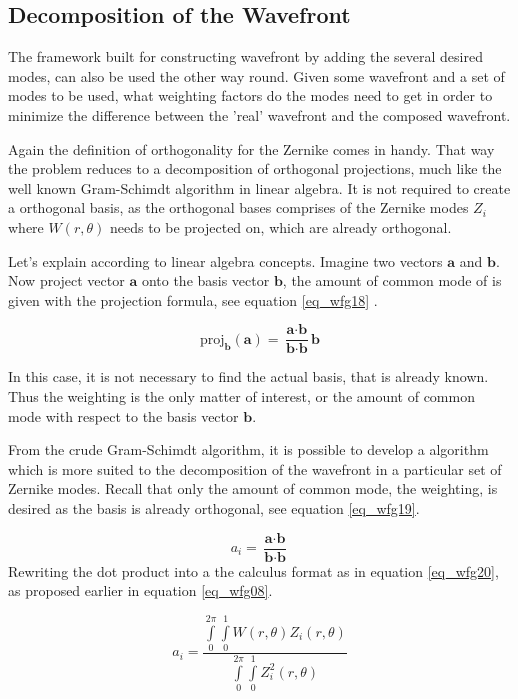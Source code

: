 \documentclass{article}
\begin{document}
\newpage
\subsection{Decomposition of the Wavefront}
The framework built for constructing wavefront by adding the several desired modes, can also be used the other way round. Given some wavefront and a set of modes to be used, what weighting factors do the modes need to get in order to minimize the difference between the 'real' wavefront and the composed wavefront.

Again the definition of orthogonality for the Zernike comes in handy. That way the problem reduces to a decomposition of orthogonal projections, much like the well known Gram-Schimdt algorithm in linear algebra. It is not required to create a orthogonal basis, as the orthogonal bases comprises of the Zernike modes $Z_i$ where $W(r,\theta)$ needs to be projected on, which are already orthogonal.

Let's explain according to linear algebra concepts. Imagine two vectors $\textbf{a}$ and $\textbf{b}$. Now project vector $\textbf{a}$ onto the basis vector $\textbf{b}$, the amount of common mode of is given with the projection formula, see equation \ref{eq_wfg18} \cite{lay}.

\begin{equation}
\text{proj}_{\textbf{b}}(\textbf{a}) = \frac{\textbf{a} \cdot \textbf{b}}{\textbf{b} \cdot \textbf{b}} \textbf{b}
\label{eq_wfg18}
\end{equation}

In this case, it is not necessary to find the actual basis, that is already known. Thus the weighting is the only matter of interest, or the amount of common mode with respect to the basis vector $\textbf{b}$.  

From the crude Gram-Schimdt algorithm, it is possible to develop a algorithm which is more suited to the decomposition of the wavefront in a particular set of Zernike modes. Recall that only the amount of common mode, the weighting,  is desired as the basis is already orthogonal, see equation \ref{eq_wfg19}.

\begin{equation}
a_i =  \frac{\textbf{a} \cdot \textbf{b}}{\textbf{b} \cdot \textbf{b}}
\label{eq_wfg19}
\end{equation}
Rewriting the dot product into a the calculus format as in equation \ref{eq_wfg20}, as proposed earlier in equation \ref{eq_wfg08}.

\begin{equation}
a_i = \frac{\int \limits_{0}^{2\pi} \int \limits_{0}^{1} W(r,\theta) Z_i(r,\theta)}{\int \limits_{0}^{2\pi} \int \limits_{0}^{1} Z_{i}^{2}(r,\theta) }
\label{eq_wfg20}
\end{equation}
\end{document}

